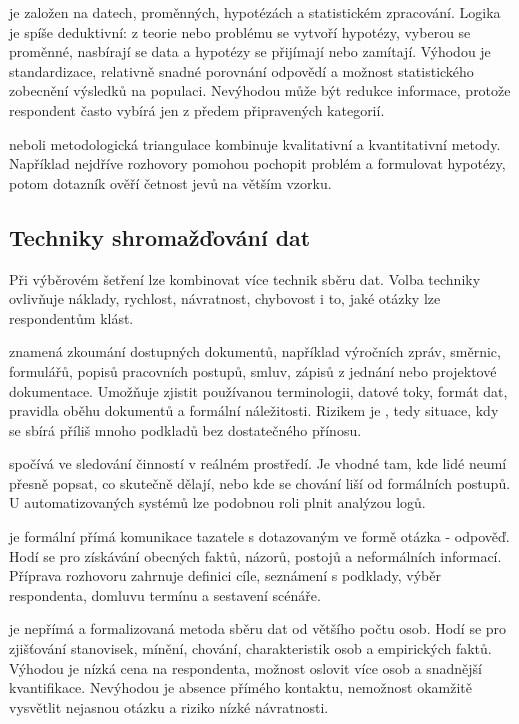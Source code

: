  je založen na datech, proměnných, hypotézách a statistickém zpracování.
Logika je spíše deduktivní: z teorie nebo problému se vytvoří hypotézy, vyberou se proměnné,
nasbírají se data a hypotézy se přijímají nebo zamítají. Výhodou je standardizace, relativně snadné
porovnání odpovědí a možnost statistického zobecnění výsledků na populaci. Nevýhodou může být
redukce informace, protože respondent často vybírá jen z předem připravených kategorií.

 neboli metodologická triangulace kombinuje kvalitativní a kvantitativní metody.
Například nejdříve rozhovory pomohou pochopit problém a formulovat hypotézy, potom dotazník ověří
četnost jevů na větším vzorku.

\subsection{Techniky shromažďování dat}
Při výběrovém šetření lze kombinovat více technik sběru dat. Volba techniky ovlivňuje náklady,
rychlost, návratnost, chybovost i to, jaké otázky lze respondentům klást.

 znamená zkoumání dostupných dokumentů, například výročních zpráv,
směrnic, formulářů, popisů pracovních postupů, smluv, zápisů z jednání nebo projektové dokumentace.
Umožňuje zjistit používanou terminologii, datové toky, formát dat, pravidla oběhu dokumentů a
formální náležitosti. Rizikem je , tedy situace, kdy se sbírá příliš mnoho
podkladů bez dostatečného přínosu.

 spočívá ve sledování činností v reálném prostředí. Je vhodné tam, kde lidé neumí
přesně popsat, co skutečně dělají, nebo kde se chování liší od formálních postupů. U automatizovaných
systémů lze podobnou roli plnit analýzou logů.

 je formální přímá komunikace tazatele s dotazovaným ve formě otázka - odpověď. Hodí
se pro získávání obecných faktů, názorů, postojů a neformálních informací. Příprava rozhovoru
zahrnuje definici cíle, seznámení s podklady, výběr respondenta, domluvu termínu a sestavení scénáře.

 je nepřímá a formalizovaná metoda sběru dat od většího počtu osob. Hodí se pro
zjišťování stanovisek, mínění, chování, charakteristik osob a empirických faktů. Výhodou je nízká
cena na respondenta, možnost oslovit více osob a snadnější kvantifikace. Nevýhodou je absence
přímého kontaktu, nemožnost okamžitě vysvětlit nejasnou otázku a riziko nízké návratnosti.

